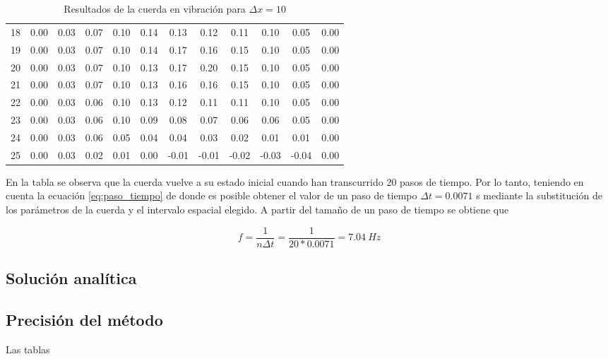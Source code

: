 \documentclass[11pt]{article}
\begin{document}
\begin{table}
\begin{small}
\begin{tabular}{ c c c c c c c c c c c c }
18 & 0.00 & 0.03 & 0.07 & 0.10 & 0.14 & 0.13 & 0.12 & 0.11 & 0.10 & 0.05 & 0.00 \\
19 & 0.00 & 0.03 & 0.07 & 0.10 & 0.14 & 0.17 & 0.16 & 0.15 & 0.10 & 0.05 & 0.00 \\
\hline
20 & 0.00 & 0.03 & 0.07 & 0.10 & 0.13 & 0.17 & 0.20 & 0.15 & 0.10 & 0.05 & 0.00 \\
\hline
21 & 0.00 & 0.03 & 0.07 & 0.10 & 0.13 & 0.16 & 0.16 & 0.15 & 0.10 & 0.05 & 0.00 \\
22 & 0.00 & 0.03 & 0.06 & 0.10 & 0.13 & 0.12 & 0.11 & 0.11 & 0.10 & 0.05 & 0.00 \\
23 & 0.00 & 0.03 & 0.06 & 0.10 & 0.09 & 0.08 & 0.07 & 0.06 & 0.06 & 0.05 & 0.00 \\
24 & 0.00 & 0.03 & 0.06 & 0.05 & 0.04 & 0.04 & 0.03 & 0.02 & 0.01 & 0.01 & 0.00 \\
25 & 0.00 & 0.03 & 0.02 & 0.01 & 0.00 & -0.01 & -0.01 & -0.02 & -0.03 & -0.04 & 0.00 \\
\end{tabular}
\end{small}
\caption{Resultados de la cuerda en vibración para $\Delta{x} = 10$}
\label{tab:est_freq}
\end{table}

En la tabla se observa que la cuerda vuelve a su estado inicial cuando han transcurrido
20 pasos de tiempo. Por lo tanto, teniendo en cuenta la ecuación \ref{eq:paso_tiempo} de
donde es posible obtener el valor de un paso de tiempo $\Delta{t} = 0.0071$ s mediante la
substitución de los parámetros de la cuerda y el intervalo espacial elegido. A partir del
tamaño de un paso de tiempo se obtiene que

\begin{equation}
f = \frac{1}{n \Delta{t}} = \frac{1}{20 * 0.0071} = 7.04~Hz
\end{equation}

\subsection{Solución analítica}

\subsection{Precisión del método}

Las tablas  
\end{document}
